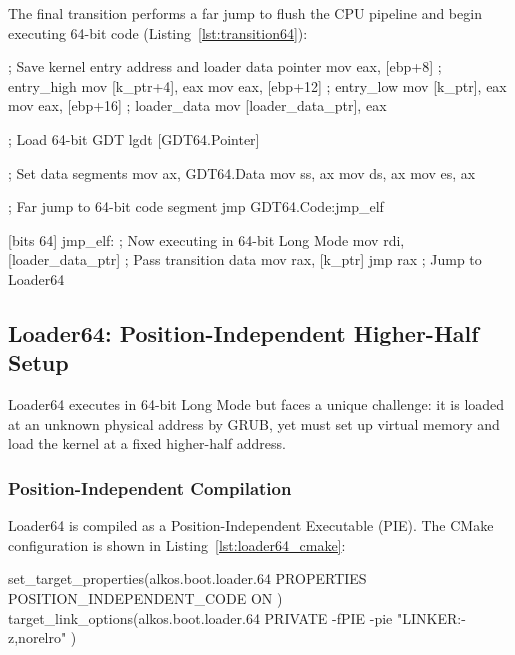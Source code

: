 \documentclass[a4paper,10pt,twoside]{report}
\theoremstyle{definition}
\begin{document}
\clearpage

The final transition performs a far jump to flush the CPU pipeline and begin executing 64-bit code (Listing~\ref{lst:transition64}):

\begin{nasmcode}[caption={Transition to 64-bit Mode (transition\_64.nasm)}, label={lst:transition64}]
    ; Save kernel entry address and loader data pointer
    mov eax, [ebp+8]            ; entry_high
    mov [k_ptr+4], eax
    mov eax, [ebp+12]           ; entry_low  
    mov [k_ptr], eax
    mov eax, [ebp+16]           ; loader_data
    mov [loader_data_ptr], eax
    
    ; Load 64-bit GDT
    lgdt [GDT64.Pointer]
    
    ; Set data segments
    mov ax, GDT64.Data
    mov ss, ax
    mov ds, ax
    mov es, ax
    
    ; Far jump to 64-bit code segment
    jmp GDT64.Code:jmp_elf

[bits 64]
jmp_elf:
    ; Now executing in 64-bit Long Mode
    mov rdi, [loader_data_ptr]  ; Pass transition data
    mov rax, [k_ptr]
    jmp rax                     ; Jump to Loader64
\end{nasmcode}

\subsection{Loader64: Position-Independent Higher-Half Setup}

Loader64 executes in 64-bit Long Mode but faces a unique challenge: it is loaded at an unknown physical address by GRUB, yet must set up virtual memory and load the kernel at a fixed higher-half address.

\clearpage

\subsubsection{Position-Independent Compilation}

Loader64 is compiled as a Position-Independent Executable (PIE). The CMake configuration is shown in Listing~\ref{lst:loader64_cmake}:

\begin{cmakecode}[caption={Loader64 CMake Configuration}, label={lst:loader64_cmake}]
set_target_properties(alkos.boot.loader.64 PROPERTIES 
    POSITION_INDEPENDENT_CODE ON
)
target_link_options(alkos.boot.loader.64 PRIVATE
    -fPIE -pie
    "LINKER:-z,norelro"
)
\end{cmakecode}
\end{document}
